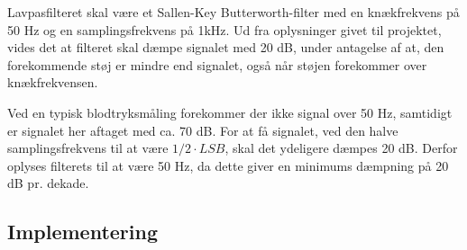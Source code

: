 Lavpasfilteret skal være et Sallen-Key Butterworth-filter med en knækfrekvens på 50 Hz og en samplingsfrekvens på 1kHz. Ud fra oplysninger givet til projektet, vides det at filteret skal dæmpe signalet med 20 dB, under antagelse af at, den forekommende støj er mindre end signalet, også når støjen forekommer over knækfrekvensen.

Ved en typisk blodtryksmåling forekommer der ikke signal over 50 Hz, samtidigt er signalet her aftaget med ca. 70 dB. For at få signalet, ved den halve samplingsfrekvens til at være $ 1/2 \cdot LSB $, skal det ydeligere dæmpes 20 dB. Derfor oplyses filterets til at være 50 Hz, da dette giver en minimums dæmpning på 20 dB pr. dekade.

\subsection{Implementering}
